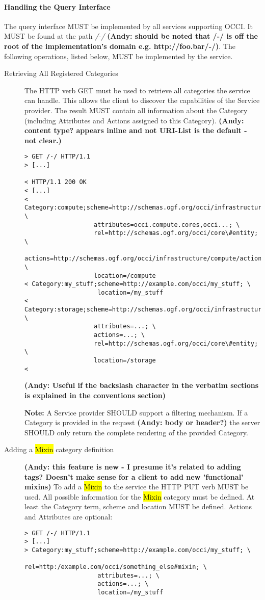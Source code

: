 \documentclass[10pt,a4paper]{article}
\begin{document}
\paragraph{Handling the Query Interface}
The query interface MUST be implemented by all services supporting
OCCI. It MUST be found at the path \emph{/-/} \textbf{(Andy: should be 
noted that /-/ is off the root of the implementation's domain e.g. http://foo.bar/-/)}. The following
operations, listed below, MUST be implemented by the service.

\begin{description}
\item[Retrieving All Registered Categories] The HTTP verb GET must be
  used to retrieve all categories the service can handle. This allows
  the client to discover the capabilities of the Service provider. The
  result MUST contain all information about the Category (including
  Attributes and Actions assigned to this Category). \textbf{(Andy: content type? appears inline and not URI-List is the default - not clear.)}
\begin{verbatim}
> GET /-/ HTTP/1.1
> [...]
 
< HTTP/1.1 200 OK
< [...]
< Category:compute;scheme=http://schemas.ogf.org/occi/infrastructure; \
                   attributes=occi.compute.cores,occi...; \
                   rel=http://schemas.ogf.org/occi/core\#entity; \
                   actions=http://schemas.ogf.org/occi/infrastructure/compute/action#stop,...; \
                   location=/compute
< Category:my_stuff;scheme=http://example.com/occi/my_stuff; \
                    location=/my_stuff
< Category:storage;scheme=http://schemas.ogf.org/occi/infrastructure; \
                   attributes=...; \
                   actions=...; \
                   rel=http://schemas.ogf.org/occi/core\#entity; \
                   location=/storage
< 
\end{verbatim}
\textbf{(Andy: Useful if the backslash character in the verbatim sections 
is explained in the conventions section)}

\textbf{Note:} A Service provider SHOULD support a filtering
mechanism. If a Category is provided in the request \textbf{(Andy: body or header?)} the 
server SHOULD
only return the complete rendering of the provided Category.

\item[Adding a \hl{Mixin} category definition] \textbf{(Andy: this feature is new - 
I presume it's related to adding tags? Doesn't make sense for a client to add new 'functional' mixins)}
To add a \hl{Mixin} to
  the service the HTTP PUT verb MUST be used. All possible information
  for the \hl{Mixin} category must be defined. At least the Category
  term, scheme and location MUST be defined. Actions and Attributes
  are optional:
\begin{verbatim}
> GET /-/ HTTP/1.1
> [...]
> Category:my_stuff;scheme=http://example.com/occi/my_stuff; \
                    rel=http:/example.com/occi/something_else#mixin; \
                    attributes=...; \
                    actions=...; \
                    location=/my_stuff


\end{verbatim}
\end{description}
\end{document}
